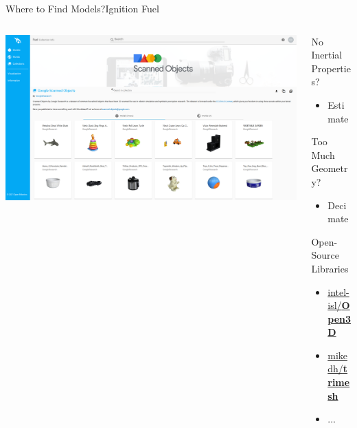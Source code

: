 \begin{frame}{Where to Find Models?}{Ignition Fuel}
    \centering
    \begin{columns}%
        \begin{column}{0.69\textwidth}%
            \centering
            \href{https://app.ignitionrobotics.org/GoogleResearch/fuel/collections/Google Scanned Objects}{\includegraphics[width=\textwidth]{graphics/fuel_google_scanned_objects.png}}
        \end{column}
        \begin{column}{0.31\textwidth}%
            \centering
            \begin{block}{No Inertial Properties?}
                \begin{itemize}
                    \item Estimate
                \end{itemize}
            \end{block}
            \begin{block}{Too Much Geometry?}
                \begin{itemize}
                    \item Decimate
                \end{itemize}
            \end{block}
            \begin{block}{Open-Source Libraries}
                \begin{itemize}
                    \item \href{https://github.com/intel-isl/Open3D}{intel-isl/\textbf{Open3D}}
                    \item \href{https://github.com/mikedh/trimesh}{mikedh/\textbf{trimesh}}
                    \item ...
                \end{itemize}
            \end{block}
        \end{column}
    \end{columns}
\end{frame}


